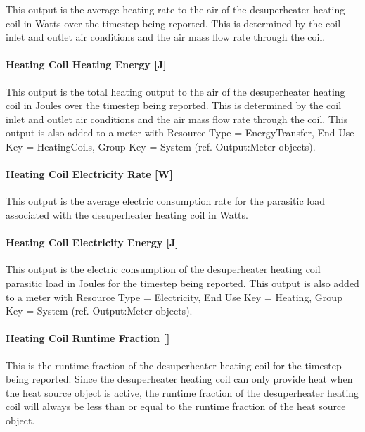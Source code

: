 This output is the average heating rate to the air of the desuperheater heating coil in Watts over the timestep being reported. This is determined by the coil inlet and outlet air conditions and the air mass flow rate through the coil.

\paragraph{Heating Coil Heating Energy {[}J{]}}\label{heating-coil-heating-energy-j-3}

This output is the total heating output to the air of the desuperheater heating coil in Joules over the timestep being reported. This is determined by the coil inlet and outlet air conditions and the air mass flow rate through the coil. This output is also added to a meter with Resource Type = EnergyTransfer, End Use Key = HeatingCoils, Group Key = System (ref. Output:Meter objects).

\paragraph{Heating Coil Electricity Rate {[}W{]}}\label{heating-coil-electric-power-w-2}

This output is the average electric consumption rate for the parasitic load associated with the desuperheater heating coil in Watts.

\paragraph{Heating Coil Electricity Energy {[}J{]}}\label{heating-coil-electric-energy-j-1}

This output is the electric consumption of the desuperheater heating coil parasitic load in Joules for the timestep being reported. This output is also added to a meter with Resource Type = Electricity, End Use Key = Heating, Group Key = System (ref. Output:Meter objects).

\paragraph{Heating Coil Runtime Fraction {[]}}\label{heating-coil-runtime-fraction}

This is the runtime fraction of the desuperheater heating coil for the timestep being reported. Since the desuperheater heating coil can only provide heat when the heat source object is active, the runtime fraction of the desuperheater heating coil will always be less than or equal to the runtime fraction of the heat source object.

